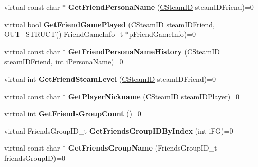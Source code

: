 \begin{DoxyCompactItemize}
\mbox{\label{class_i_steam_friends_a2bfbd1689cf78511bda6ee3b753ec773}} 
virtual const char $\ast$ {\bfseries Get\+Friend\+Persona\+Name} (\hyperlink{class_c_steam_i_d}{C\+Steam\+ID} steam\+I\+D\+Friend)=0
\item 
\mbox{\label{class_i_steam_friends_a7a2c2b3994169056d50ef805393648ab}} 
virtual bool {\bfseries Get\+Friend\+Game\+Played} (\hyperlink{class_c_steam_i_d}{C\+Steam\+ID} steam\+I\+D\+Friend, O\+U\+T\+\_\+\+S\+T\+R\+U\+CT() \hyperlink{struct_friend_game_info__t}{Friend\+Game\+Info\+\_\+t} $\ast$p\+Friend\+Game\+Info)=0
\item 
\mbox{\label{class_i_steam_friends_a57fa398ce9edb552da199821f3598077}} 
virtual const char $\ast$ {\bfseries Get\+Friend\+Persona\+Name\+History} (\hyperlink{class_c_steam_i_d}{C\+Steam\+ID} steam\+I\+D\+Friend, int i\+Persona\+Name)=0
\item 
\mbox{\label{class_i_steam_friends_a922c14f329d09c0f4aa251b5900e475a}} 
virtual int {\bfseries Get\+Friend\+Steam\+Level} (\hyperlink{class_c_steam_i_d}{C\+Steam\+ID} steam\+I\+D\+Friend)=0
\item 
\mbox{\label{class_i_steam_friends_a9ea8988ff44219141dec56deb123d3cd}} 
virtual const char $\ast$ {\bfseries Get\+Player\+Nickname} (\hyperlink{class_c_steam_i_d}{C\+Steam\+ID} steam\+I\+D\+Player)=0
\item 
\mbox{\label{class_i_steam_friends_a6dc3d91e79c8efcc5666640eeaa988d8}} 
virtual int {\bfseries Get\+Friends\+Group\+Count} ()=0
\item 
\mbox{\label{class_i_steam_friends_a1a6e422dac40f8f15242a6a45c752d2f}} 
virtual Friends\+Group\+I\+D\+\_\+t {\bfseries Get\+Friends\+Group\+I\+D\+By\+Index} (int i\+FG)=0
\item 
\mbox{\label{class_i_steam_friends_a54c2657d4d5e27f47069e64aaeda2f53}} 
virtual const char $\ast$ {\bfseries Get\+Friends\+Group\+Name} (Friends\+Group\+I\+D\+\_\+t friends\+Group\+ID)=0
\item 
\mbox{\label{class_i_steam_friends_a6fe9e93a63c5d8007eec7c65482ad397}} 

\end{DoxyCompactItemize}
